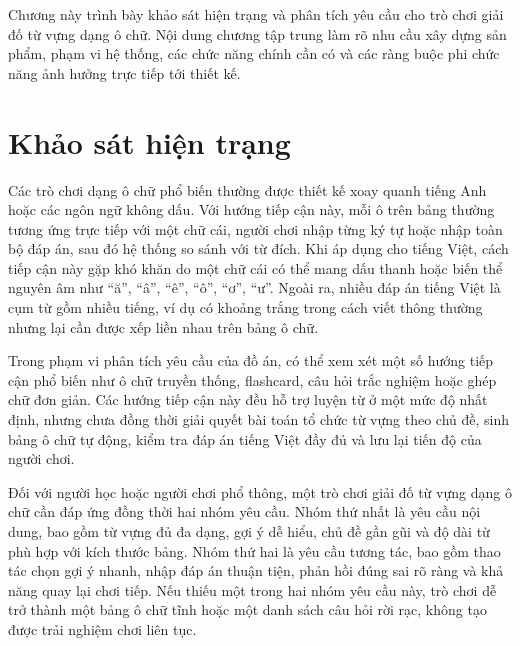 ﻿\documentclass[../DoAn.tex]{subfiles}
\begin{document}
Chương này trình bày khảo sát hiện trạng và phân tích yêu cầu cho trò chơi giải đố từ vựng dạng ô chữ. Nội dung chương tập trung làm rõ nhu cầu xây dựng sản phẩm, phạm vi hệ thống, các chức năng chính cần có và các ràng buộc phi chức năng ảnh hưởng trực tiếp tới thiết kế.

\section{Khảo sát hiện trạng}
\label{section:2.1}
Các trò chơi dạng ô chữ phổ biến thường được thiết kế xoay quanh tiếng Anh hoặc các ngôn ngữ không dấu. Với hướng tiếp cận này, mỗi ô trên bảng thường tương ứng trực tiếp với một chữ cái, người chơi nhập từng ký tự hoặc nhập toàn bộ đáp án, sau đó hệ thống so sánh với từ đích. Khi áp dụng cho tiếng Việt, cách tiếp cận này gặp khó khăn do một chữ cái có thể mang dấu thanh hoặc biến thể nguyên âm như ``ă'', ``â'', ``ê'', ``ô'', ``ơ'', ``ư''. Ngoài ra, nhiều đáp án tiếng Việt là cụm từ gồm nhiều tiếng, ví dụ có khoảng trắng trong cách viết thông thường nhưng lại cần được xếp liền nhau trên bảng ô chữ.

Trong phạm vi phân tích yêu cầu của đồ án, có thể xem xét một số hướng tiếp cận phổ biến như ô chữ truyền thống, flashcard, câu hỏi trắc nghiệm hoặc ghép chữ đơn giản. Các hướng tiếp cận này đều hỗ trợ luyện từ ở một mức độ nhất định, nhưng chưa đồng thời giải quyết bài toán tổ chức từ vựng theo chủ đề, sinh bảng ô chữ tự động, kiểm tra đáp án tiếng Việt đầy đủ và lưu lại tiến độ của người chơi.

Đối với người học hoặc người chơi phổ thông, một trò chơi giải đố từ vựng dạng ô chữ cần đáp ứng đồng thời hai nhóm yêu cầu. Nhóm thứ nhất là yêu cầu nội dung, bao gồm từ vựng đủ đa dạng, gợi ý dễ hiểu, chủ đề gần gũi và độ dài từ phù hợp với kích thước bảng. Nhóm thứ hai là yêu cầu tương tác, bao gồm thao tác chọn gợi ý nhanh, nhập đáp án thuận tiện, phản hồi đúng sai rõ ràng và khả năng quay lại chơi tiếp. Nếu thiếu một trong hai nhóm yêu cầu này, trò chơi dễ trở thành một bảng ô chữ tĩnh hoặc một danh sách câu hỏi rời rạc, không tạo được trải nghiệm chơi liên tục.
\end{document}
